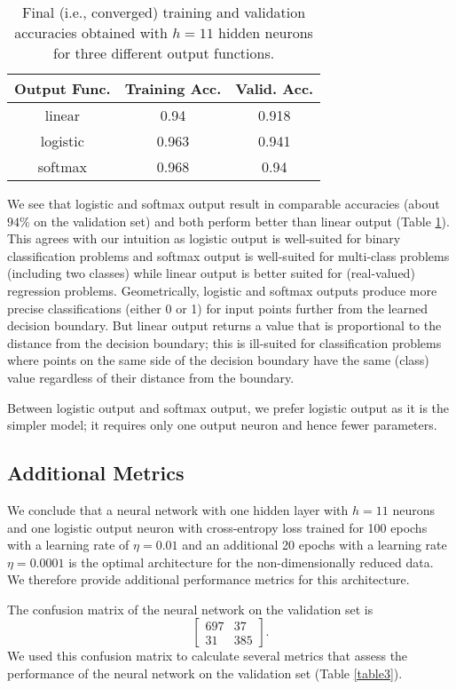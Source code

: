 \documentclass[12pt]{article}
\begin{document}
\begin{table}
\centering
\begin{tabular}{|c|c|c|} \hline
Output Func. & Training Acc. & Valid. Acc. \\ \hline
linear & 0.94 & 0.918 \\
logistic & 0.963 & 0.941 \\
softmax & 0.968 & 0.94 \\
\hline
\end{tabular}
\caption{\label{table2} Final (i.e., converged) training and validation accuracies obtained with $h=11$ hidden neurons for three different output functions.}
\end{table}

We see that logistic and softmax output result in comparable accuracies (about $94\%$ on the validation set) and both perform better than linear output (Table \ref{table2}). This agrees with our intuition as logistic output is well-suited for binary classification problems and softmax output is well-suited for multi-class problems (including two classes) while linear output is better suited for (real-valued) regression problems. Geometrically, logistic and softmax outputs produce more precise classifications (either 0 or 1) for input points further from the learned decision boundary. But linear output returns a value that is proportional to the distance from the decision boundary; this is ill-suited for classification problems where points on the same side of the decision boundary have the same (class) value regardless of their distance from the boundary.

Between logistic output and softmax output, we prefer logistic output as it is the simpler model; it requires only one output neuron and hence fewer parameters.


\subsection{Additional Metrics}
\label{results-metrics}

We conclude that a neural network with one hidden layer with $h=11$ neurons and one logistic output neuron with cross-entropy loss trained for 100 epochs with a learning rate of $\eta=0.01$ and an additional 20 epochs with a learning rate $\eta=0.0001$ is the optimal architecture for the non-dimensionally reduced data. We therefore provide additional performance metrics for this architecture.

The confusion matrix of the neural network on the validation set is
\[ \begin{bmatrix}
697 & 37 \\
31 & 385
\end{bmatrix}. \]
We used this confusion matrix to calculate several metrics that assess the performance of the neural network on the validation set (Table \ref{table3}).
\end{document}

